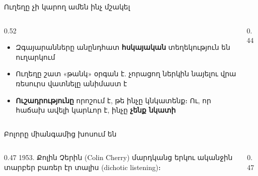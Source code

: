 
\begin{frame}{Ուղեղը չի կարող ամեն ինչ մշակել}
  \begin{columns}[T]
    \begin{column}{0.52\textwidth}
      \begin{itemize}
        \item Զգայարանները անընդհատ \textbf{հսկայական} տեղեկություն են ուղարկում
        \item<2-> Ուղեղը շատ «թանկ» օրգան է. չորացող ներկին նայելու վրա ռեսուրս վատնելը անիմաստ է
        \item<3-> \textbf{Ուշադրությունը} որոշում է, թե ինչը կնկատենք։ Ու, որ հաճախ ավելի կարևոր է, ինչը \textbf{չենք նկատի}
      \end{itemize}
    \end{column}
    \begin{column}{0.44\textwidth}
    \end{column}
  \end{columns}
\end{frame}

\begin{frame}{Բոլորը միանգամից խոսում են}
  \centering
  \par\smallskip
  \begin{columns}[T]
    \begin{column}{0.47\textwidth}
      \small 1953. Քոլին Չերին (Colin Cherry) մարդկանց երկու ականջին տարբեր բառեր էր տալիս (dichotic listening)։
    \end{column}
    \begin{column}{0.47\textwidth}
    \end{column}
  \end{columns}
\end{frame}

